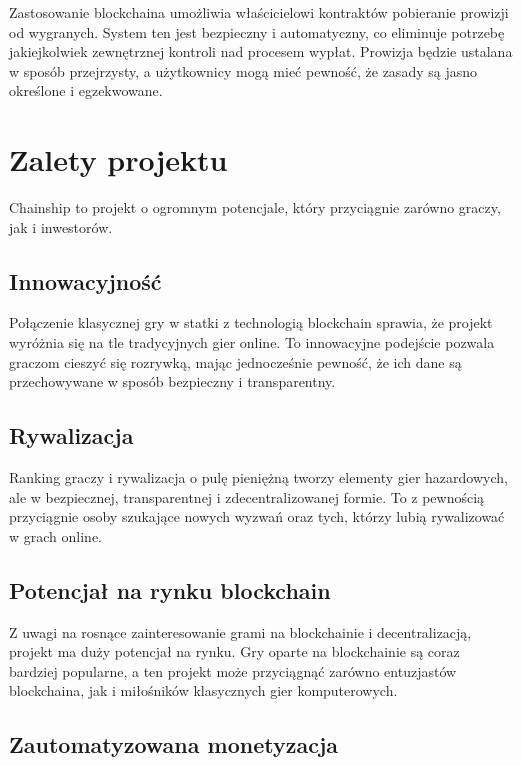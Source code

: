 \documentclass{article}
\begin{document}
Zastosowanie blockchaina umożliwia właścicielowi kontraktów pobieranie prowizji od wygranych. System ten jest bezpieczny i automatyczny, co eliminuje potrzebę jakiejkolwiek zewnętrznej kontroli nad procesem wypłat. Prowizja będzie ustalana w sposób przejrzysty, a użytkownicy mogą mieć pewność, że zasady są jasno określone i egzekwowane.

\section{Zalety projektu}

Chainship to projekt o ogromnym potencjale, który przyciągnie zarówno graczy, jak i inwestorów.

\subsection{Innowacyjność}

Połączenie klasycznej gry w statki z technologią blockchain sprawia, że projekt wyróżnia się na tle tradycyjnych gier online. To innowacyjne podejście pozwala graczom cieszyć się rozrywką, mając jednocześnie pewność, że ich dane są przechowywane w sposób bezpieczny i transparentny.

\subsection{Rywalizacja}

Ranking graczy i rywalizacja o pulę pieniężną tworzy elementy gier hazardowych, ale w bezpiecznej, transparentnej i zdecentralizowanej formie. To z pewnością przyciągnie osoby szukające nowych wyzwań oraz tych, którzy lubią rywalizować w grach online.

\subsection{Potencjał na rynku blockchain}

Z uwagi na rosnące zainteresowanie grami na blockchainie i decentralizacją, projekt ma duży potencjał na rynku. Gry oparte na blockchainie są coraz bardziej popularne, a ten projekt może przyciągnąć zarówno entuzjastów blockchaina, jak i miłośników klasycznych gier komputerowych.

\subsection{Zautomatyzowana monetyzacja}
\end{document}
